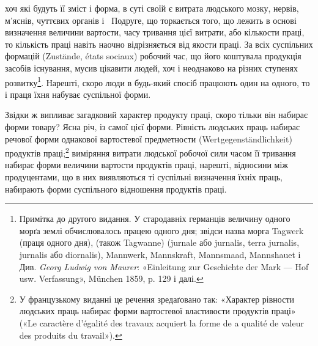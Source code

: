 \parcont{}  %
хоч які будуть її зміст і форма, в суті своїй є витрата людського
мозку, нервів, м’яснів, чуттєвих органів і~ Подруге, що торкається
того, що лежить в основі визначення величини вартости,
часу тривання цієї витрати, або кількости праці, то кількість
праці навіть наочно відрізняється від якости праці. За всіх суспільних
формацій (Zustände, états sociaux) робочий час, що його
коштувала продукція засобів існування, мусив цікавити людей,
хоч і неоднаково на різних ступенях розвитку\footnote{
Примітка до другого видання. У стародавніх германців величину
одного морґа землі обчислювалось працею одного дня; звідси назва морга
Tagwerk (праця одного дня), (також Tagwanne) (jurnale або jurnalis,
terra jurnalis, jurnalis або diornalis), Mannwerk, Mannskraft, Mannsmaad,
Mannshauet і~ Див. \emph{Georg Ludwig von Maurer}: «Einleitung zur Geschichte
der Mark — Hof usw. Verfassung», München 1859, p. 129 і далі.
}. Нарешті, скоро
люди в будь-який спосіб працюють один на одного, то і праця
їхня набуває суспільної форми.

Звідки ж випливає загадковий характер продукту праці,
скоро тільки він набирає форми товару? Ясна річ, із самої цієї
форми. Рівність людських праць набирає речової форми однакової
вартостевої предметности (\textgerman{Wertgegenständlichkeit}) продуктів
праці;\footnote*{
У французькому виданні це речення зредаґовано так: «Характер
рівности людських праць набирає форми вартостевої властивости продуктів
праці» («Le caractère d’égalité des travaux acquiert la forme de
a qualité de valeur des produits du travail»).
} виміряння витрати людської робочої сили часом її тривання
набирає форми величини вартости продуктів праці, нарешті,
відносини між продуцентами, що в них виявляються ті
суспільні визначення їхніх праць, набирають форми суспільного
відношення продуктів праці.


